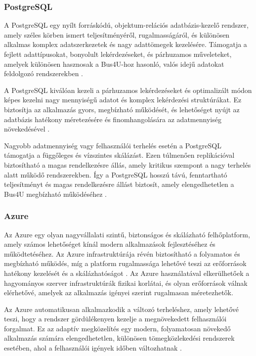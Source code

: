 \subsubsection{PostgreSQL}
A PostgreSQL egy nyílt forráskódú, objektum-relációs adatbázis-kezelő rendszer, amely széles körben ismert teljesítményéről, rugalmasságáról, és különösen alkalmas komplex adatszerkezetek és nagy adattömegek kezelésére. Támogatja a fejlett adattípusokat, bonyolult lekérdezéseket, és párhuzamos műveleteket, amelyek különösen hasznosak a Bus4U-hoz hasonló, valós idejű adatokat feldolgozó rendszerekben \cite{douglas_postgresql, murrell_postgresql}.

A PostgreSQL kiválóan kezeli a párhuzamos lekérdezéseket és optimalizált módon képes kezelni nagy mennyiségű adatot és komplex lekérdezési struktúrákat. Ez biztosítja az alkalmazás gyors, megbízható működését, és lehetőséget nyújt az adatbázis hatékony méretezésére és finomhangolására az adatmennyiség növekedésével \cite{murrell_postgresql}.

Nagyobb adatmennyiség vagy felhasználói terhelés esetén a PostgreSQL támogatja a függőleges és vízszintes skálázást. Ezen túlmenően replikációval biztosítható a magas rendelkezésre állás, amely kritikus szempont a nagy terhelés alatt működő rendszerekben. Így a PostgreSQL hosszú távú, fenntartható teljesítményt és magas rendelkezésre állást biztosít, amely elengedhetetlen a Bus4U megbízható működéséhez \cite{douglas_postgresql}.

\subsubsection{Azure}
Az Azure egy olyan nagyvállalati szintű, biztonságos és skálázható felhőplatform, amely számos lehetőséget kínál modern alkalmazások fejlesztéséhez és működtetéséhez. Az Azure infrastruktúrája révén biztosítható a folyamatos és megbízható működés, míg a platform rugalmassága lehetővé teszi az erőforrások hatékony kezelését és a skálázhatóságot \cite{wilder_azure, collier_azure}. Az Azure használatával elkerülhetőek a hagyományos szerver infrastruktúrák fizikai korlátai, és olyan erőforrások válnak elérhetővé, amelyek az alkalmazás igényei szerint rugalmasan méretezhetők.

Az Azure automatikusan alkalmazkodik a változó terheléshez, amely lehetővé teszi, hogy a rendszer gördülékenyen kezelje a megnövekedett felhasználói forgalmat. Ez az adaptív megközelítés egy modern, folyamatosan növekedő alkalmazás számára elengedhetetlen, különösen tömegközlekedési rendszerek esetében, ahol a felhasználói igények időben változhatnak \cite{wilder_azure}.

